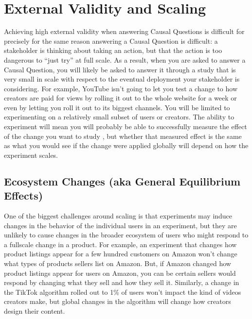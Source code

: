 \documentclass[letterpaper,10pt,english]{jupyterBook}
\begin{document}
\section{External Validity and Scaling}
\label{\detokenize{30_questions/45_causal_questions_external:external-validity-and-scaling}}
\sphinxAtStartPar
Achieving high external validity when answering Causal Questions is difficult for precisely for the same reason answering a Causal Question is difficult: a stakeholder is thinking about taking an action, but that the action is too dangerous to “just try” at full scale. As a result, when you are asked to answer a Causal Question, you will likely be asked to answer it through a study that is very small in scale with respect to the eventual deployment your stakeholder is considering. For example, YouTube isn’t going to let you test a change to how creators are paid for views by rolling it out to the whole website for a week or even by letting you roll it out to its biggest channels. You will be limited to experimenting on a relatively small subset of users or creators. The ability to experiment will mean you will probably be able to successfully measure the effect of the change you want to study , but whether that measured effect is the same as what you would see if the change were applied globally will depend on how the experiment scales.


\subsection{Ecosystem Changes (aka General Equilibrium Effects)}
\label{\detokenize{30_questions/45_causal_questions_external:ecosystem-changes-aka-general-equilibrium-effects}}
\sphinxAtStartPar
One of the biggest challenges around scaling is that experiments may induce changes in the behavior of the individual users in an experiment, but they are unlikely to cause changes in the broader ecosystem of users who might respond to a full\sphinxhyphen{}scale change in a product. For example, an experiment that changes how product listings appear for a few hundred customers on Amazon won’t change what types of products sellers list on Amazon. But, if Amazon changed how product listings appear for  users on Amazon, you can be certain sellers would respond by changing what they sell and how they sell it. Similarly, a change in the TikTok algorithm rolled out to 1\% of users won’t impact the kind of videos creators make, but global changes in the algorithm will  change how creators design their content.
\end{document}
